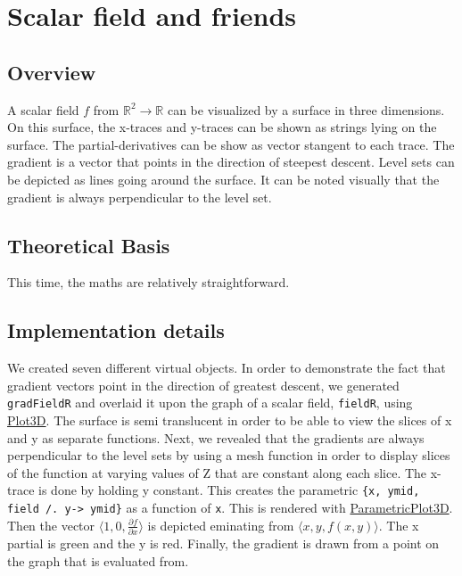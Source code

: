 \section{Scalar field and friends}

\subsection*{Overview}

A scalar field \(f\) from \(\mathbb R^2 \to \mathbb R\) can be visualized by a surface in three dimensions. On this surface, the x-traces and y-traces can be shown as strings lying on the surface. The partial-derivatives can be show as vector stangent to each trace. The gradient is a vector that points in the direction of steepest descent. Level sets can be depicted as lines going around the surface. It can be noted visually that the gradient is always perpendicular to the level set. \cite{field6}

\subsection*{Theoretical Basis}

This time, the maths are relatively straightforward.


\subsection*{Implementation details}

We created seven different virtual objects. In order to demonstrate the fact that gradient vectors point in the direction of greatest descent, we generated \verb+gradFieldR+ and overlaid it upon the graph of a scalar field, \verb+fieldR+, using \href{https://reference.wolfram.com/language/ref/Plot3D.html}{Plot3D}. The surface is semi translucent in order to be able to view the slices of x and y as separate functions. Next, we revealed that the gradients are always perpendicular to the level sets by using a mesh function in order to display slices of the function at varying values of Z that are constant along each slice. The x-trace is done by holding y constant. This creates the parametric \verb+{x, ymid, field /. y-> ymid}+ as a function of \verb+x+. This is rendered with \href{https://reference.wolfram.com/language/ref/ParametricPlot3D.html}{ParametricPlot3D}. Then the vector $\langle 1, 0, \frac{\partial f}{\partial x} \rangle$ is depicted eminating from $\langle x, y, f(x, y) \rangle$. The x partial is green and the y is red. Finally, the gradient is drawn from a point on the graph that is evaluated from.

